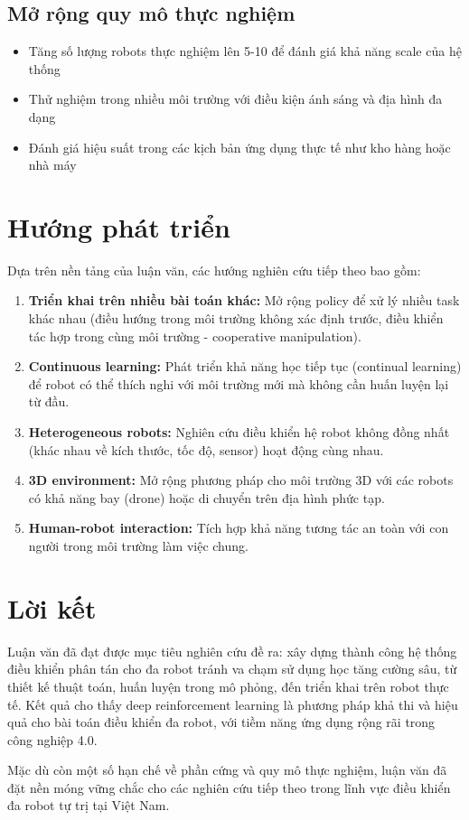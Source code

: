 \subsection{Mở rộng quy mô thực nghiệm}

\begin{itemize}[nosep]
\item Tăng số lượng robots thực nghiệm lên 5-10 để đánh giá khả năng scale của hệ thống
\item Thử nghiệm trong nhiều môi trường với điều kiện ánh sáng và địa hình đa dạng
\item Đánh giá hiệu suất trong các kịch bản ứng dụng thực tế như kho hàng hoặc nhà máy
\end{itemize}

\section{Hướng phát triển}
\label{sec:future_work}

Dựa trên nền tảng của luận văn, các hướng nghiên cứu tiếp theo bao gồm:

\begin{enumerate}[nosep]
\item \textbf{Triển khai trên nhiều bài toán khác:} Mở rộng policy để xử lý nhiều task khác nhau (điều hướng trong môi trường không xác định trước, điều khiển tác hợp trong cùng môi trường - cooperative manipulation).

\item \textbf{Continuous learning:} Phát triển khả năng học tiếp tục (continual learning) để robot có thể thích nghi với môi trường mới mà không cần huấn luyện lại từ đầu.

\item \textbf{Heterogeneous robots:} Nghiên cứu điều khiển hệ robot không đồng nhất (khác nhau về kích thước, tốc độ, sensor) hoạt động cùng nhau.

\item \textbf{3D environment:} Mở rộng phương pháp cho môi trường 3D với các robots có khả năng bay (drone) hoặc di chuyển trên địa hình phức tạp.

\item \textbf{Human-robot interaction:} Tích hợp khả năng tương tác an toàn với con người trong môi trường làm việc chung.
\end{enumerate}

\section{Lời kết}
\label{sec:final}

Luận văn đã đạt được mục tiêu nghiên cứu đề ra: xây dựng thành công hệ thống điều khiển phân tán cho đa robot tránh va chạm sử dụng học tăng cường sâu, từ thiết kế thuật toán, huấn luyện trong mô phỏng, đến triển khai trên robot thực tế. Kết quả cho thấy deep reinforcement learning là phương pháp khả thi và hiệu quả cho bài toán điều khiển đa robot, với tiềm năng ứng dụng rộng rãi trong công nghiệp 4.0.

Mặc dù còn một số hạn chế về phần cứng và quy mô thực nghiệm, luận văn đã đặt nền móng vững chắc cho các nghiên cứu tiếp theo trong lĩnh vực điều khiển đa robot tự trị tại Việt Nam.
